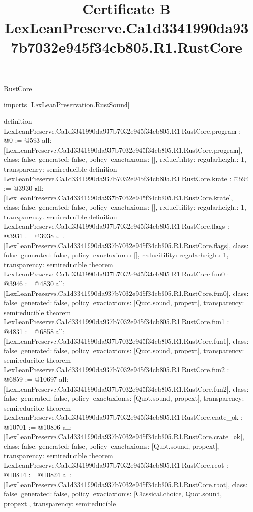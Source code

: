 \begin{lexlean}{RustCore}
\title{Certificate B LexLeanPreserve.Ca1d3341990da937b7032e945f34cb805.R1.RustCore}
\begin{coremodule}
imports [LexLeanPreservation.RustSound]

definition LexLeanPreserve.Ca1d3341990da937b7032e945f34cb805.R1.RustCore.program : @0 := @593 {
  all: [LexLeanPreserve.Ca1d3341990da937b7032e945f34cb805.R1.RustCore.program],
  class: false,
  generated: false,
  policy: exact{axioms: []},
  reducibility: regular{height: 1},
  transparency: semireducible
}
definition LexLeanPreserve.Ca1d3341990da937b7032e945f34cb805.R1.RustCore.krate : @594 := @3930 {
  all: [LexLeanPreserve.Ca1d3341990da937b7032e945f34cb805.R1.RustCore.krate],
  class: false,
  generated: false,
  policy: exact{axioms: []},
  reducibility: regular{height: 1},
  transparency: semireducible
}
definition LexLeanPreserve.Ca1d3341990da937b7032e945f34cb805.R1.RustCore.flags : @3931 := @3938 {
  all: [LexLeanPreserve.Ca1d3341990da937b7032e945f34cb805.R1.RustCore.flags],
  class: false,
  generated: false,
  policy: exact{axioms: []},
  reducibility: regular{height: 1},
  transparency: semireducible
}
theorem LexLeanPreserve.Ca1d3341990da937b7032e945f34cb805.R1.RustCore.fun0 : @3946 := @4830 {
  all: [LexLeanPreserve.Ca1d3341990da937b7032e945f34cb805.R1.RustCore.fun0],
  class: false,
  generated: false,
  policy: exact{axioms: [Quot.sound, propext]},
  transparency: semireducible
}
theorem LexLeanPreserve.Ca1d3341990da937b7032e945f34cb805.R1.RustCore.fun1 : @4831 := @6858 {
  all: [LexLeanPreserve.Ca1d3341990da937b7032e945f34cb805.R1.RustCore.fun1],
  class: false,
  generated: false,
  policy: exact{axioms: [Quot.sound, propext]},
  transparency: semireducible
}
theorem LexLeanPreserve.Ca1d3341990da937b7032e945f34cb805.R1.RustCore.fun2 : @6859 := @10697 {
  all: [LexLeanPreserve.Ca1d3341990da937b7032e945f34cb805.R1.RustCore.fun2],
  class: false,
  generated: false,
  policy: exact{axioms: [Quot.sound, propext]},
  transparency: semireducible
}
theorem LexLeanPreserve.Ca1d3341990da937b7032e945f34cb805.R1.RustCore.crate_ok : @10701 := @10806 {
  all: [LexLeanPreserve.Ca1d3341990da937b7032e945f34cb805.R1.RustCore.crate_ok],
  class: false,
  generated: false,
  policy: exact{axioms: [Quot.sound, propext]},
  transparency: semireducible
}
theorem LexLeanPreserve.Ca1d3341990da937b7032e945f34cb805.R1.RustCore.root : @10814 := @10824 {
  all: [LexLeanPreserve.Ca1d3341990da937b7032e945f34cb805.R1.RustCore.root],
  class: false,
  generated: false,
  policy: exact{axioms: [Classical.choice, Quot.sound, propext]},
  transparency: semireducible
}


\end{coremodule}
\end{lexlean}
